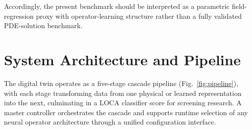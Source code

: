 \documentclass[journal]{IEEEtran}
\begin{document}
Accordingly, the present benchmark should be interpreted as a parametric field-regression proxy with operator-learning structure rather than a fully validated PDE-solution benchmark.

\section{System Architecture and Pipeline}
\label{sec:system}

The digital twin operates as a five-stage cascade pipeline (Fig.~\ref{fig:pipeline}), with each stage transforming data from one physical or learned representation into the next, culminating in a LOCA classifier score for screening research. A master controller orchestrates the cascade and supports runtime selection of any neural operator architecture through a unified configuration interface.
\end{document}

